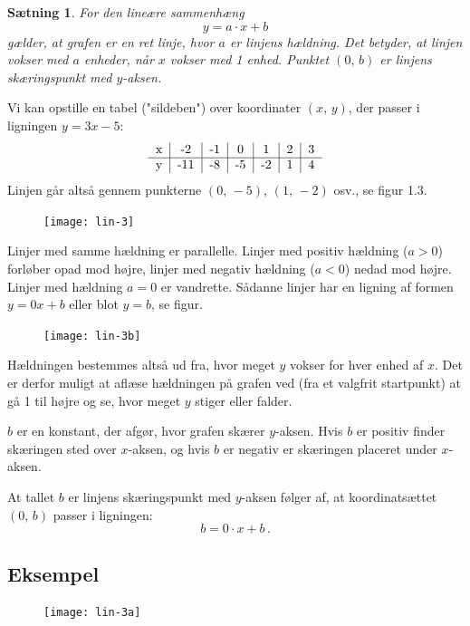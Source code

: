 \documentclass[12pt,oneside,a4paper]{article}
\newtheorem{thm}{Sætning}[section]
\begin{document}
\begin{thm}
    For den lineære sammenhæng
    $$
    y = a\cdot x + b
    $$
    gælder, at grafen er en ret linje, hvor $a$ er linjens {\em hældning}.  Det
    betyder, at linjen vokser med $a$ enheder, når $x$ vokser med 1 enhed.
    Punktet $(0,\,b)$ er linjens {\em skæringspunkt med $y$-aksen}.
\end{thm}

Vi kan opstille en tabel ("sildeben") over koordinater $(x,\,y)$, der passer i
ligningen $y=3x-5$:
$$
\begin{tabular}{c|c|c|c|c|c|c}
    x &  -2 & -1 &  0 &  1 & 2 & 3 \\
    \hline
    y & -11 & -8 & -5 & -2 & 1 & 4
\end{tabular}
$$
Linjen går altså gennem punkterne $(0,\,-5)$, $(1,\,-2)$ osv., se figur 1.3.

\begin{figure}[H]
    \centering
    \texttt{[image: lin-3]}
\end{figure}

Linjer med samme hældning er parallelle. Linjer med positiv hældning ($a>0$) forløber
opad mod højre, linjer med negativ hældning ($a<0$) nedad mod højre. Linjer med
hældning $a=0$ er vandrette.  Sådanne linjer har en ligning af formen $y=0x+b$
eller blot $y=b$, se figur.

\begin{figure}[H]
    \centering
    \texttt{[image: lin-3b]}
\end{figure}

Hældningen bestemmes altså ud fra, hvor meget $y$ vokser for hver enhed af $x$. Det
er derfor muligt at aflæse hældningen på grafen ved (fra et valgfrit startpunkt)
at gå 1 til højre og se, hvor meget $y$ stiger eller falder.

$b$ er en konstant, der afgør, hvor grafen skærer $y$-aksen. Hvis $b$ er positiv finder
skæringen sted over $x$-aksen, og hvis $b$ er negativ er skæringen placeret under $x$-aksen.

At tallet $b$ er linjens skæringspunkt med $y$-aksen følger af, at
koordinatsættet $(0,\,b)$ passer i ligningen:
$$
b = 0\cdot x+b \,.
$$


\subsection{Eksempel}
\begin{figure}[H]
    \centering
    \texttt{[image: lin-3a]}
\end{figure}
\end{document}
